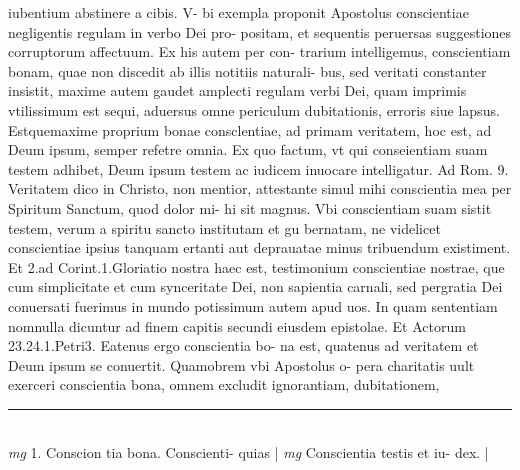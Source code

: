 \documentclass{article}
\begin{document}
\begin{pages}
iubentium abstinere a cibis. V-    bi exempla proponit Apostolus conscientiae negligentis regulam in verbo Dei pro- positam, et sequentis peruersas suggestiones corruptorum affectuum. Ex his autem per con- trarium intelligemus, conscientiam bonam, quae non discedit ab illis notitiis naturali- bus, sed veritati constanter insistit, maxime autem gaudet amplecti regulam verbi Dei, quam imprimis vtilissimum est sequi, aduersus omne periculum dubitationis, erroris siue lapsus. Estquemaxime proprium bonae consclentiae, ad primam veritatem, hoc est, ad Deum ipsum, semper refetre omnia. Ex quo factum, vt qui conseientiam suam testem adhibet, Deum ipsum testem ac iudicem inuocare intelligatur. Ad Rom. 9. Veritatem dico in Christo, non mentior, attestante simul mihi conscientia mea per Spiritum Sanctum, quod dolor mi- hi sit magnus. Vbi conscientiam suam sistit testem, verum a spiritu sancto institutam et gu   bernatam, ne videlicet conscientiae ipsius tanquam ertanti aut deprauatae minus tribuendum existiment. Et 2.ad Corint.1.Gloriatio nostra haec est, testimonium conscientiae nostrae, que    cum simplicitate et cum synceritate Dei, non sapientia carnali, sed pergratia Dei conuersati   fuerimus in mundo potissimum autem apud uos. In quam sententiam nomnulla dicuntur ad finem   capitis secundi eiusdem epistolae. Et Actorum 23.24.1.Petri3. Eatenus ergo conscientia bo- na est, quatenus ad veritatem et Deum ipsum se conuertit. Quamobrem vbi Apostolus o- pera charitatis uult exerceri conscientia bona, omnem excludit ignorantiam, dubitationem,  \pend
\vspace{0.5cm}\noindent
\vspace{0.2cm}\rule{1cm}{0.2pt}\\ 
\hspace{0.2cm}\textit{mg}
\footnotesize 1. Conscion tia bona. Conscienti- quias 
\normalsize| 
\hspace{0.2cm}\textit{mg}
\footnotesize Conscientia testis et iu- dex. 
\normalsize| 

\end{pages}
\end{document}
